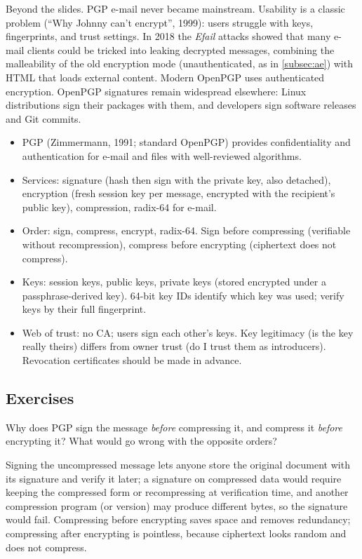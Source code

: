 \begin{remark}
Beyond the slides. PGP e-mail never became mainstream. Usability is a classic problem (\enquote{Why Johnny can't encrypt}, 1999): users struggle with keys, fingerprints, and trust settings. In 2018 the \emph{Efail} attacks showed that many e-mail clients could be tricked into leaking decrypted messages, combining the malleability of the old encryption mode (unauthenticated, as in \cref{subsec:ae}) with HTML that loads external content. Modern OpenPGP uses authenticated encryption. OpenPGP signatures remain widespread elsewhere: Linux distributions sign their packages with them, and developers sign software releases and Git commits.
\end{remark}

\begin{summary}
\begin{itemize}
    \item PGP (Zimmermann, 1991; standard OpenPGP) provides confidentiality and authentication for e-mail and files with well-reviewed algorithms.
    \item Services: signature (hash then sign with the private key, also detached), encryption (fresh session key per message, encrypted with the recipient's public key), compression, radix-64 for e-mail.
    \item Order: sign, compress, encrypt, radix-64. Sign before compressing (verifiable without recompression), compress before encrypting (ciphertext does not compress).
    \item Keys: session keys, public keys, private keys (stored encrypted under a passphrase-derived key). 64-bit key IDs identify which key was used; verify keys by their full fingerprint.
    \item Web of trust: no CA; users sign each other's keys. Key legitimacy (is the key really theirs) differs from owner trust (do I trust them as introducers). Revocation certificates should be made in advance.
\end{itemize}
\end{summary}

\subsection*{Exercises}

\begin{exercise}
Why does PGP sign the message \emph{before} compressing it, and compress it \emph{before} encrypting it? What would go wrong with the opposite orders?
\end{exercise}
\begin{solution}
Signing the uncompressed message lets anyone store the original document with its signature and verify it later; a signature on compressed data would require keeping the compressed form or recompressing at verification time, and another compression program (or version) may produce different bytes, so the signature would fail. Compressing before encrypting saves space and removes redundancy; compressing after encrypting is pointless, because ciphertext looks random and does not compress.
\end{solution}

